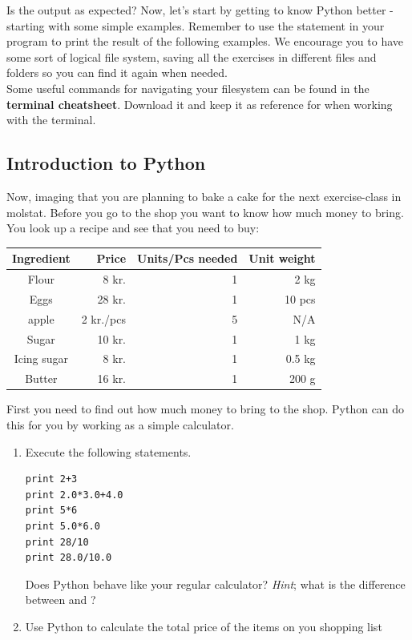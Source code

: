 \documentclass{article}
\begin{document}
Is the output as expected?
%
Now, let's start by getting to know Python better - starting with some simple examples. Remember to use the  statement in your program to print the result of the following examples.
We encourage you to have some sort of logical file system, saving all the exercises in different files and folders so you can find it again when needed. \\

Some useful commands for navigating your filesystem can be found in the \textbf{terminal cheatsheet}.
Download it and keep it as reference for when working with the terminal.\\

\subsection{Introduction to Python}

Now, imaging that you are planning to bake a cake for the next exercise-class in molstat.
Before you go to the shop you want to know how much money  to bring.
You look up a recipe and see that you need to buy:

\vspace{10pt }
 
\begin{center}
    \begin{tabular}{c r r r}
    \hline
    Ingredient & Price & Units/Pcs needed & Unit weight \\
    \hline
    Flour & 8 kr. & 1  & 2 kg \\
    Eggs & 28 kr. & 1  & 10 pcs \\
    apple & 2 kr./pcs & 5   & N/A\\
    Sugar & 10 kr.& 1  & 1 kg \\
    Icing sugar &  8 kr. & 1   & 0.5 kg \\
    Butter & 16 kr. & 1  & 200 g \\
    \end{tabular}
\end{center}

First you need to find out how much money to bring to the shop.
Python can do this for you by working as a simple calculator.

\begin{enumerate}
    \item Execute the following statements.
\begin{lstlisting}
print 2+3
print 2.0*3.0+4.0
print 5*6
print 5.0*6.0
print 28/10
print 28.0/10.0
\end{lstlisting}
    Does Python behave like your regular calculator?
    {\em Hint}; what is the difference between {} and {}? 
    
    \item Use Python  to calculate the total price of the items on you shopping list  
\end{enumerate}
\end{document}
